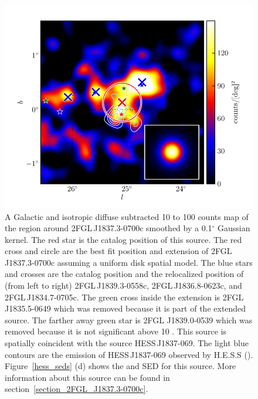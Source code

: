\documentclass[12pt,preprint]{aastex}
\newcommand{\gev}{\text{GeV}\xspace}
\newcommand{\tev}{\text{TeV}\xspace}
\renewcommand{\deg}{\ensuremath{^\circ}\xspace}
\begin{document}
\begin{figure}
  \begin{center}
    \includegraphics[type=pdf,ext=.pdf,read=.pdf]{source_plots/source_1FGL_J1837.5-0659c}
  \end{center}
  \caption{
  A Galactic and isotropic diffuse subtracted 10 \gev to 100 \gev
  counts map of the region around 2FGL\,J1837.3-0700c smoothed by a
  0.1\deg Gaussian kernel.  The red star is the catalog position of
  this source. The red cross and circle are the best fit position and
  extension  of 2FGL\,J1837.3-0700c assuming a uniform disk spatial model.
  The blue stars and crosses are the catalog position and the relocalized
  position of (from left to right) 2FGL\,J1839.3-0558c, 2FGL\,J1836.8-0623c,
  and 2FGL\,J1834.7-0705c.  The green cross inside the extension is 
  2FGL\,J1835.5-0649 which was removed because it
  is part of the extended source.  The farther away green star is 2FGL
  J1839.0-0539 which was removed because it is not significant above
  10 \gev.  This source is spatially coincident with the \tev source 
  HESS\,J1837-069.  The light blue contours are the \tev emission of HESS\,J1837-069
  observed by H.E.S.S (\cite{hess_plane_survey}).  
  Figure~\ref{hess_seds} (d) shows the \gev and
  \tev SED for this source. 
  More information about
  this source can be found in section~\ref{section_2FGL_J1837.3-0700c}.
  }\label{1FGL_J1837.5-0659c}
\end{figure}
\end{document}
